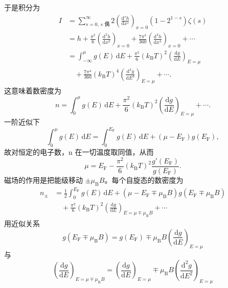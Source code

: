 于是积分为
\begin{align*}
I &= \sum_{s=0,\,s\text{ 偶}}^{\infty}2\left(\frac{\mathrm{d}^{s}h}{\mathrm{d}x^{s}}\right)_{x=0}(1-2^{1-s})\zeta(s)\\
&= h + \frac{\pi^{2}}{6}\left(\frac{\mathrm{d}^{2}h}{\mathrm{d}x^{2}}\right)_{x=0} + \frac{7\pi^{4}}{360}\left(\frac{\mathrm{d}^{4}h}{\mathrm{d}x^{4}}\right)_{x=0} + \cdots\\
&= \int_{-\infty}^{\mu}g(E)\,\mathrm{d}E + \frac{\pi^{2}}{6}(k_{\mathrm{B}}T)^{2}\left(\frac{\mathrm{d}g}{\mathrm{d}E}\right)_{E=\mu}\\
&\quad + \frac{7\pi^{4}}{360}(k_{\mathrm{B}}T)^{4}\left(\frac{\mathrm{d}^{3}g}{\mathrm{d}E^{3}}\right)_{E=\mu} + \cdots.\tag{F.84}
\end{align*}
这意味着数密度为
\begin{equation*}
n = \int_{0}^{\mu}g(E)\,\mathrm{d}E + \frac{\pi^{2}}{6}(k_{\mathrm{B}}T)^{2}\left(\frac{\mathrm{d}g}{\mathrm{d}E}\right)_{E=\mu} + \cdots.\tag{F.85}
\end{equation*}
一阶近似下
\begin{equation*}
\int_{0}^{\mu}g(E)\,\mathrm{d}E = \int_{0}^{E_{\mathrm{F}}}g(E)\,\mathrm{d}E + (\mu-E_{\mathrm{F}})g(E_{\mathrm{F}}),\tag{F.86}
\end{equation*}
故对恒定的电子数，n 在一切温度取同值，从而
\begin{equation*}
\mu = E_{\mathrm{F}} - \frac{\pi^{2}}{6}(k_{\mathrm{B}}T)^{2}\frac{g'(E_{\mathrm{F}})}{g(E_{\mathrm{F}})}.\tag{F.87}
\end{equation*}
磁场的作用是把能级移动 $\pm\mu_{\mathrm{B}}B$。每个自旋态的数密度为
\begin{align*}
n_{\pm} &= \frac{1}{2}\int_{0}^{E_{\mathrm{F}}}g(E)\,\mathrm{d}E + (\mu-E_{\mathrm{F}}\mp\mu_{\mathrm{B}}B)g(E_{\mathrm{F}}\mp\mu_{\mathrm{B}}B)\\
&\quad + \frac{\pi^{2}}{6}(k_{\mathrm{B}}T)^{2}\left(\frac{\mathrm{d}g}{\mathrm{d}E}\right)_{E=\mu\mp\mu_{\mathrm{B}}B} + \cdots\tag{F.88}
\end{align*}
用近似关系
\begin{equation*}
g(E_{\mathrm{F}}\mp\mu_{\mathrm{B}}B) = g(E_{\mathrm{F}}) \mp \mu_{\mathrm{B}}B\left(\frac{\mathrm{d}g}{\mathrm{d}E}\right)_{E=\mu}\tag{F.89}
\end{equation*}
与
\begin{equation*}
\left(\frac{\mathrm{d}g}{\mathrm{d}E}\right)_{E=\mu\mp\mu_{\mathrm{B}}B} = \left(\frac{\mathrm{d}g}{\mathrm{d}E}\right)_{E=\mu} \mp \mu_{\mathrm{B}}B\left(\frac{\mathrm{d}^{2}g}{\mathrm{d}E^{2}}\right)_{E=\mu}\tag{F.90}
\end{equation*}
